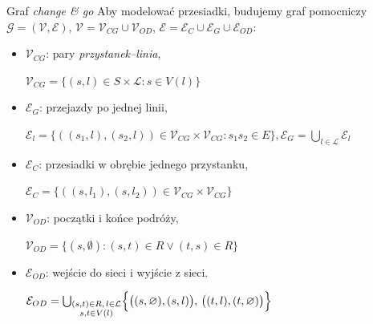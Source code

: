 \documentclass[ignorenonframetext]{beamer}
\newcommand{\formal}[1]{\par{\small\color{black!60}#1}}
\begin{document}
\begin{frame}{Graf \emph{change \& go}}
  Aby modelować przesiadki, budujemy graf pomocniczy \(\mathcal{G} = (\mathcal{V}, \mathcal{E})\),
  \(\mathcal{V} = \mathcal{V}_{CG} \cup \mathcal{V}_{OD}\), \(\mathcal{E} = \mathcal{E}_{C} \cup \mathcal{E}_{G} \cup \mathcal{E}_{OD}\):
  \begin{itemize}
  \item \(\mathcal{V}_{CG}\): pary \emph{przystanek--linia},
    \formal{\(\mathcal{V}_{CG} = \{ (s, l) \in S \times \mathcal{L} : s \in V(l)\}\)} 
  \item \(\mathcal{E}_{G}\): przejazdy po jednej linii,
    \formal{\(\mathcal{E}_{l} = \{ ((s_1, l), (s_2, l)) \in \mathcal{V}_{CG} \times \mathcal{V}_{CG} : s_1s_2 \in E\}, \mathcal{E}_{G} = \bigcup_{l \in \mathcal{L}} \mathcal{E}_{l}\)}
  \item \(\mathcal{E}_{C}\): przesiadki w obrębie jednego przystanku,
    \formal{\(\mathcal{E}_{C} = \{ ((s, l_1), (s, l_2)) \in \mathcal{V}_{CG} \times \mathcal{V}_{CG} \}\)}
  \item \(\mathcal{V}_{OD}\): początki i końce podróży,
    \formal{\(\mathcal{V}_{OD} = \{ (s, \emptyset) : (s,t) \in R \lor (t,s) \in R\}\)}
  \item \(\mathcal{E}_{OD}\): wejście do sieci i wyjście z sieci.
    \formal{\(\mathcal{E}_{OD} = \bigcup_{\substack{(s,t) \in R, \, l \in \mathcal{L} \\ s,t \in V(l)}} 
    \Bigl\{ \bigl( (s, \varnothing), (s, l) \bigr), \, \bigl( (t, l), (t, \varnothing) \bigr) \Bigr\} \)}
  \end{itemize}
\end{frame}
\end{document}
